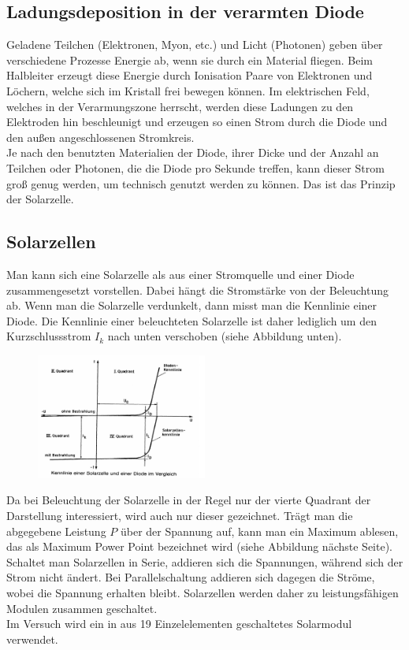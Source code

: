 \subsection{Ladungsdeposition in der verarmten Diode}

Geladene Teilchen (Elektronen, Myon, etc.) und Licht (Photonen) geben über verschiedene Prozesse Energie ab, wenn sie durch ein Material fliegen. Beim Halbleiter erzeugt diese Energie durch Ionisation Paare von Elektronen und Löchern, welche sich im Kristall frei bewegen können. Im elektrischen Feld, welches in der Verarmungszone herrscht, werden diese Ladungen zu den Elektroden hin beschleunigt und erzeugen so einen Strom durch die Diode und den außen angeschlossenen Stromkreis.\\
Je nach den benutzten Materialien der Diode, ihrer Dicke und der Anzahl an Teilchen oder Photonen, die die Diode pro Sekunde treffen, kann dieser Strom groß genug werden, um technisch genutzt werden zu können. Das ist das Prinzip der Solarzelle.

\subsection{Solarzellen}

Man kann sich eine Solarzelle als aus einer Stromquelle und einer Diode zusammengesetzt vorstellen. Dabei hängt die Stromstärke von der Beleuchtung ab. Wenn man die Solarzelle verdunkelt, dann misst man die Kennlinie einer Diode. Die Kennlinie einer beleuchteten Solarzelle ist daher lediglich um den Kurzschlussstrom $I_k$ nach unten verschoben (siehe Abbildung unten).\\ %
\begin{figure}[h]
	\centering
		\includegraphics[width=0.5\textwidth]{Abbildungen/Kennlinienfeld.jpg}
	\label{fig:Kennlinienfeld}
\end{figure}

Da bei Beleuchtung der Solarzelle in der Regel nur der vierte Quadrant der Darstellung interessiert, wird auch nur dieser gezeichnet. Trägt man die abgegebene Leistung $P$ über der Spannung auf, kann man ein Maximum ablesen, das als Maximum Power Point bezeichnet wird (siehe Abbildung nächste Seite).\\ %
Schaltet man Solarzellen in Serie, addieren sich die Spannungen, während sich der Strom nicht ändert. Bei Parallelschaltung addieren sich dagegen die Ströme, wobei die Spannung erhalten bleibt. Solarzellen werden daher zu leistungsfähigen Modulen zusammen geschaltet.\\
Im Versuch wird ein in aus 19 Einzelelementen geschaltetes Solarmodul verwendet.

